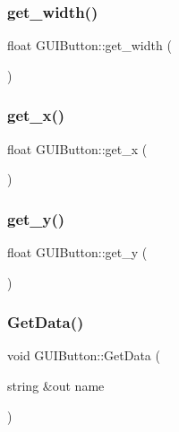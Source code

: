 \hypertarget{class_g_u_i_button_a6273c8780e85c35d080945b73174fecf}{}\label{class_g_u_i_button_a6273c8780e85c35d080945b73174fecf} 
\subsubsection{\texorpdfstring{get\+\_\+width()}{get\_width()}}
{\footnotesize\ttfamily float G\+U\+I\+Button\+::get\+\_\+width (\begin{DoxyParamCaption}{ }\end{DoxyParamCaption})}

\hypertarget{class_g_u_i_button_a63c64379507d3635a4194d64a2ed4c9d}{}\label{class_g_u_i_button_a63c64379507d3635a4194d64a2ed4c9d} 
\subsubsection{\texorpdfstring{get\+\_\+x()}{get\_x()}}
{\footnotesize\ttfamily float G\+U\+I\+Button\+::get\+\_\+x (\begin{DoxyParamCaption}{ }\end{DoxyParamCaption})}

\hypertarget{class_g_u_i_button_a9bca7ac4acd0898de53b04ed56c4a529}{}\label{class_g_u_i_button_a9bca7ac4acd0898de53b04ed56c4a529} 
\subsubsection{\texorpdfstring{get\+\_\+y()}{get\_y()}}
{\footnotesize\ttfamily float G\+U\+I\+Button\+::get\+\_\+y (\begin{DoxyParamCaption}{ }\end{DoxyParamCaption})}

\hypertarget{class_g_u_i_button_ab29545ca5ba5d67410cfc838a5ada506}{}\label{class_g_u_i_button_ab29545ca5ba5d67410cfc838a5ada506} 
\subsubsection{\texorpdfstring{Get\+Data()}{GetData()}}
{\footnotesize\ttfamily void G\+U\+I\+Button\+::\+Get\+Data (\begin{DoxyParamCaption}\item[{string \&out}]{name }\end{DoxyParamCaption})}

